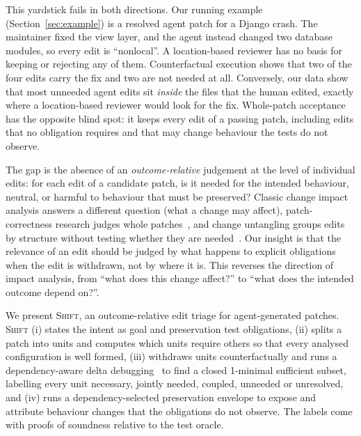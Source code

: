 \documentclass[a4paper,fleqn]{cas-sc}
\newcommand{\tool}{\textsc{Shift}}
\begin{document}
This yardstick fails in both directions. Our running example (Section~\ref{sec:example}) is a resolved agent patch for a Django crash. The maintainer fixed the view layer, and the agent instead changed two database modules, so every edit is ``nonlocal''. A location-based reviewer has no basis for keeping or rejecting any of them. Counterfactual execution shows that two of the four edits carry the fix and two are not needed at all. Conversely, our data show that most unneeded agent edits sit \emph{inside} the files that the human edited, exactly where a location-based reviewer would look for the fix. Whole-patch acceptance has the opposite blind spot: it keeps every edit of a passing patch, including edits that no obligation requires and that may change behaviour the tests do not observe.

The gap is the absence of an \emph{outcome-relative} judgement at the level of individual edits: for each edit of a candidate patch, is it needed for the intended behaviour, neutral, or harmful to behaviour that must be preserved? Classic change impact analysis answers a different question (what a change may affect), patch-correctness research judges whole patches~\citep{qi2015kali,smith2015cure,wang2020apr}, and change untangling groups edits by structure without testing whether they are needed~\citep{herzig2013tangled,barnett2015untangle}. Our insight is that the relevance of an edit should be judged by what happens to explicit obligations when the edit is withdrawn, not by where it is. This reverses the direction of impact analysis, from ``what does this change affect?'' to ``what does the intended outcome depend on?''.

We present \tool{}, an outcome-relative edit triage for agent-generated patches. \tool{} (i) states the intent as goal and preservation test obligations, (ii) splits a patch into units and computes which units require others so that every analysed configuration is well formed, (iii) withdraws units counterfactually and runs a dependency-aware delta debugging~\citep{zeller2002ddmin} to find a closed 1-minimal sufficient subset, labelling every unit necessary, jointly needed, coupled, unneeded or unresolved, and (iv) runs a dependency-selected preservation envelope to expose and attribute behaviour changes that the obligations do not observe. The labels come with proofs of soundness relative to the test oracle.
\end{document}
